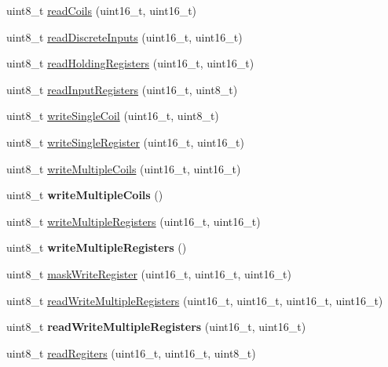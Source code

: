 \begin{DoxyCompactItemize}
\item 
uint8\+\_\+t \hyperlink{class_modbus_master485_a06cca56a5d9dd46229dc87ce172e9a9e}{read\+Coils} (uint16\+\_\+t, uint16\+\_\+t)
\item 
uint8\+\_\+t \hyperlink{class_modbus_master485_acb777ac7541ede98f681adbd01434553}{read\+Discrete\+Inputs} (uint16\+\_\+t, uint16\+\_\+t)
\item 
uint8\+\_\+t \hyperlink{class_modbus_master485_afdc381f1ada07bbd13a265bdb06bb34f}{read\+Holding\+Registers} (uint16\+\_\+t, uint16\+\_\+t)
\item 
uint8\+\_\+t \hyperlink{class_modbus_master485_a9083f52d2a0a15489e3e6e4ec2458002}{read\+Input\+Registers} (uint16\+\_\+t, uint8\+\_\+t)
\item 
uint8\+\_\+t \hyperlink{class_modbus_master485_a03bdb4cd84a5e0a09d4250d221ad0795}{write\+Single\+Coil} (uint16\+\_\+t, uint8\+\_\+t)
\item 
uint8\+\_\+t \hyperlink{class_modbus_master485_a86c8f0ba40f2c16b33a6f84a6538bcc8}{write\+Single\+Register} (uint16\+\_\+t, uint16\+\_\+t)
\item 
uint8\+\_\+t \hyperlink{class_modbus_master485_a9e2e723b0627d4c9aefb9b727c7c23b3}{write\+Multiple\+Coils} (uint16\+\_\+t, uint16\+\_\+t)
\item 
uint8\+\_\+t {\bfseries write\+Multiple\+Coils} ()\hypertarget{class_modbus_master485_ac7b9b4df0d7bb799cabdb01a4936b565}{}\label{class_modbus_master485_ac7b9b4df0d7bb799cabdb01a4936b565}

\item 
uint8\+\_\+t \hyperlink{class_modbus_master485_ac099952a39d535c810a9216bfbb3486a}{write\+Multiple\+Registers} (uint16\+\_\+t, uint16\+\_\+t)
\item 
uint8\+\_\+t {\bfseries write\+Multiple\+Registers} ()\hypertarget{class_modbus_master485_aa37151164bc32116f69394d78cb376f4}{}\label{class_modbus_master485_aa37151164bc32116f69394d78cb376f4}

\item 
uint8\+\_\+t \hyperlink{class_modbus_master485_ab5945a5c60765f44b64a610e8dadea85}{mask\+Write\+Register} (uint16\+\_\+t, uint16\+\_\+t, uint16\+\_\+t)
\item 
uint8\+\_\+t \hyperlink{class_modbus_master485_a27f8118287f05c7db94a5084baade945}{read\+Write\+Multiple\+Registers} (uint16\+\_\+t, uint16\+\_\+t, uint16\+\_\+t, uint16\+\_\+t)
\item 
uint8\+\_\+t {\bfseries read\+Write\+Multiple\+Registers} (uint16\+\_\+t, uint16\+\_\+t)\hypertarget{class_modbus_master485_a18cc28722522b67eec9a920452ccc364}{}\label{class_modbus_master485_a18cc28722522b67eec9a920452ccc364}

\item 
uint8\+\_\+t \hyperlink{class_modbus_master485_ae9256623255409b33851d79538762c3c}{read\+Regiters} (uint16\+\_\+t, uint16\+\_\+t, uint8\+\_\+t)
\end{DoxyCompactItemize}
